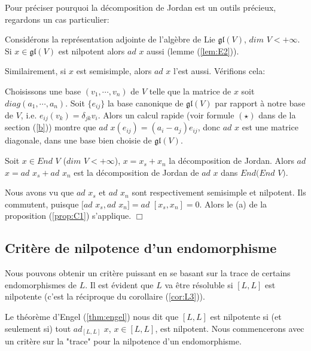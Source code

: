 \documentclass[a4paper,openany,12pt]{report}
\newcommand{\gl}{\mathfrak{gl}}
\theoremstyle{break}
{\theorembodyfont{\upshape}
\newtheorem*{rmq}{Remarque :}
\newtheorem*{prv}{Preuve :}
\newtheorem*{ex}{Exemples :}
\newtheorem*{exe}{Exemple : }
\newtheorem*{nota}{Notation :}
\newtheorem*{dem}{D\'emonstration :}}
\begin{document}
Pour préciser pourquoi la décomposition de Jordan est un outils précieux, regardons un cas particulier: 

\begin{ex}
\quad Considérons la représentation adjointe de l'algèbre de Lie $\gl(V)$, $dim$ $V < +\infty$. Si $x \in \gl(V)$ est nilpotent alors $ad$ $x$ aussi (lemme (\ref{lem:E2})).

Similairement, si $x$ est semisimple, alors $ad$ $x$ l'est aussi. Vérifions cela: 

Choisissons une base $(v_{1},\cdots,v_{n})$ de $V$ telle que la matrice de $x$ soit $diag(a_{1},\cdots,a_{n})$. Soit $\{ e_{ij} \}$ la base canonique de $\gl(V)$ par rapport à notre base de $V$, i.e. $e_{ij}(v_{k})=\delta_{jk}v_{i}$. Alors un calcul rapide (voir formule $(\star)$ dans de la section (\ref{b})) montre que $ad$ $x(e_{ij})=(a_{i}-a_{j})e_{ij}$, donc $ad$ $x$ est une matrice diagonale, dans une base bien choisie de $\gl(V)$. 
\end{ex}

\begin{lem}\label{lem:C1}
\quad Soit $x \in End$ $V$ ($dim$ $V < +\infty$), $x=x_{s}+x_{n}$ la décomposition de Jordan. Alors $ad$ $x = ad$ $x_{s}+ad$ $x_{n}$ est la décomposition de Jordan de $ad$ $x$ dans $End(End$ $V)$. 
\end{lem}

\begin{prv}
\quad Nous avons vu que $ad$ $x_{s}$ et $ad$ $x_{n}$ sont respectivement semisimple et nilpotent. Ils commutent, puisque $[ad$ $x_{s},ad$ $x_{n}] = ad$ $[x_{s},x_{n}]=0$. Alors le (a) de la proposition (\ref{prop:C1}) s'applique. $\Box$
\end{prv}

\subsection{Critère de nilpotence d'un endomorphisme}\label{a}

Nous pouvons obtenir un critère puissant en se basant sur la trace de certains endomorphismes de $L$. Il est évident que $L$ va être résoluble si $[L,L]$ est nilpotente (c'est la réciproque du corollaire (\ref{cor:L3})).

Le théorème d'Engel (\ref{thm:engel}) nous dit que $[L,L]$ est nilpotente si (et seulement si) tout $ad_{[L,L]}$ $x$, $x \in [L,L]$, est nilpotent. Nous commencerons avec un critère sur la "trace" pour la nilpotence d'un endomorphisme.
\end{document}

